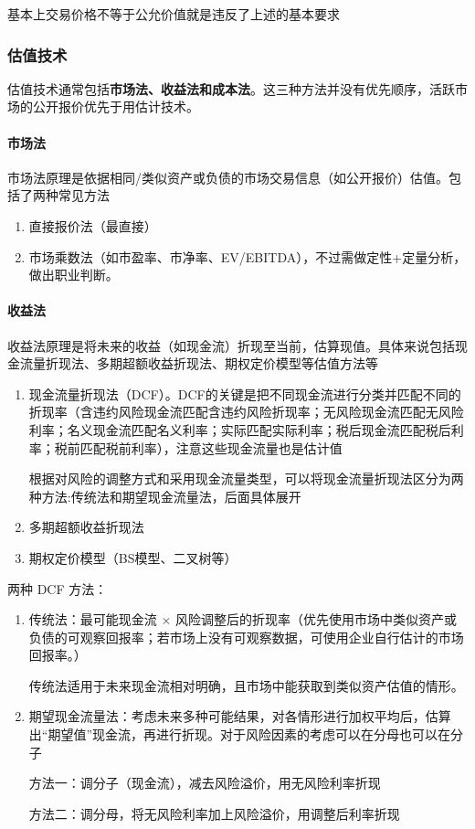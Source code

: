 \documentclass[UTF8,12pt]{ctexart}
\numberwithin{equation}{section} %
\numberwithin{figure}{section}
\numberwithin{table}{section}
\begin{document}
	基本上交易价格不等于公允价值就是违反了上述的基本要求

	\subsubsection{估值技术}
	估值技术通常包括\textbf{市场法、收益法和成本法}。这三种方法并没有优先顺序，活跃市场的公开报价优先于用估计技术。
	
	\paragraph{市场法}
	市场法原理是依据相同/类似资产或负债的市场交易信息（如公开报价）估值。包括了两种常见方法
	\begin{enumerate}
		\item 直接报价法（最直接）
		
		\item 市场乘数法（如市盈率、市净率、EV/EBITDA），不过需做定性+定量分析，做出职业判断。
	\end{enumerate}
	
	\paragraph{收益法}
	
	收益法原理是将未来的收益（如现金流）折现至当前，估算现值。具体来说包括现金流量折现法、多期超额收益折现法、期权定价模型等估值方法等
	\begin{enumerate}
		\item 现金流量折现法（DCF）。DCF的关键是把不同现金流进行分类并匹配不同的折现率（含违约风险现金流匹配含违约风险折现率；无风险现金流匹配无风险利率；名义现金流匹配名义利率；实际匹配实际利率；税后现金流匹配税后利率；税前匹配税前利率），注意这些现金流量也是估计值
		
		根据对风险的调整方式和采用现金流量类型，可以将现金流量折现法区分为两种方法:传统法和期望现金流量法，后面具体展开
		
		\item 多期超额收益折现法
		
		\item 期权定价模型（BS模型、二叉树等）
	\end{enumerate}
		
	两种 DCF 方法：
	\begin{enumerate}
		\item 传统法：最可能现金流 $\times$ 风险调整后的折现率（优先使用市场中类似资产或负债的可观察回报率；若市场上没有可观察数据，可使用企业自行估计的市场回报率。）
		
		传统法适用于未来现金流相对明确，且市场中能获取到类似资产估值的情形。
		
		\item 期望现金流量法：考虑未来多种可能结果，对各情形进行加权平均后，估算出“期望值”现金流，再进行折现。对于风险因素的考虑可以在分母也可以在分子
		
		方法一：调分子（现金流），减去风险溢价，用无风险利率折现
		
		方法二：调分母，将无风险利率加上风险溢价，用调整后利率折现
	\end{enumerate}
	
\end{document}
